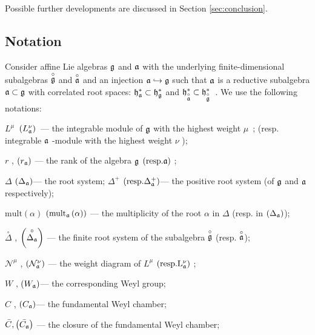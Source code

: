 \documentclass[12pt]{article}
\theoremstyle{definition}
\begin{document}
Possible further developments are discussed in Section \ref{sec:conclusion}.

\subsection{Notation}

\label{sec:notation}

Consider affine Lie algebras $\frak{g}$ and $\frak{a}$ with the underlying
finite-dimensional subalgebras $\stackrel{\circ }{\frak{g}}$ and $\stackrel{%
\circ }{\frak{a}}$ and an injection $\frak{a}\hookrightarrow \frak{g}$ such
that $\frak{a}$ is a reductive subalgebra $\frak{a\subset g}$ with
correlated root spaces: $\frak{h}_{\frak{a}}^{\ast }\subset \frak{h}_{\frak{g%
}}^{\ast }$ and $\frak{h}_{\stackrel{\circ }{\frak{a}}}^{\ast }\subset \frak{%
h}_{\stackrel{\circ }{\frak{g}}}^{\ast }$\ . We use the following notations:

$L^{\mu }$\ $\left( L_{\frak{a}}^{\nu }\right) $\ --- the integrable module
of $\frak{g}$ with the highest weight $\mu $\ ; (resp. integrable $\frak{a}$
-module with the highest weight $\nu $ );

$r$ , $\left( r_{\frak{a}}\right) $ --- the rank of the algebra $\frak{g}$ $%
\left( \mathrm{{resp. }\frak{a}}\right) $ ;

$\Delta $ $\left( \Delta _{\frak{a}}\right) $--- the root system; $\Delta
^{+} $ $\left( \mathrm{{resp. }\Delta _{\frak{a}}^{+}}\right) $--- the
positive root system (of $\frak{g}$ and $\frak{a}$ respectively);

$\mathrm{mult}\left( \alpha \right) $ $\left( \mathrm{mult}_{\frak{a}}\left(
\alpha \right) \right) $ --- the multiplicity of the root $\alpha$ in $%
\Delta $ (resp. in $\left( \Delta _{\frak{a}}\right) $);

$\stackrel{\circ }{\Delta}$ , $\left( \stackrel{\circ }{\Delta _{\frak{a}}}%
\right)$ --- the finite root system of the subalgebra $\stackrel{\circ }{%
\frak{g}}$ (resp. $\stackrel{\circ }{\frak{a}}$);

$\mathcal{N}^{\mu }$ , $\left( \mathcal{N}_{\frak{a}}^{\nu }\right) $ ---
the weight diagram of $L^{\mu }$ $\left( \mathrm{{resp. }L_{\frak{a}}^{\nu }}%
\right) $ ;

$W$ , $\left( W_{\frak{a}}\right) $--- the corresponding Weyl group;

$C$ , $\left( C_{\frak{a}}\right) $--- the fundamental Weyl chamber;

$\bar{C}, \left(\bar{C_{\frak{a}}}\right)$ --- the closure of the
fundamental Weyl chamber;
\end{document}
